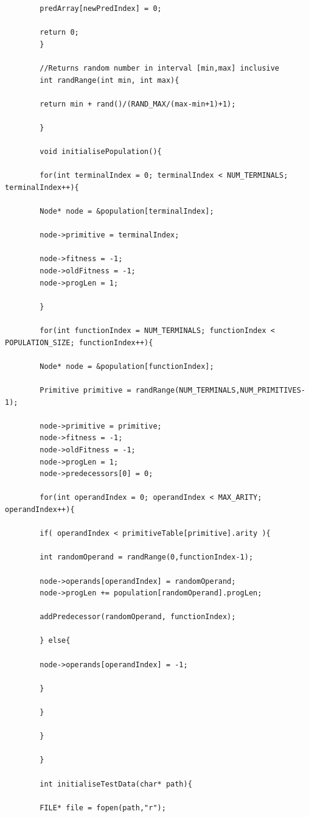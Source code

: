 \documentclass{article}
\begin{document}
\begin{lstlisting}
	    predArray[newPredIndex] = 0;
	    
	    return 0;
	    }
	    
	    //Returns random number in interval [min,max] inclusive
	    int randRange(int min, int max){
	    
	    return min + rand()/(RAND_MAX/(max-min+1)+1);
	    
	    }
	    
	    void initialisePopulation(){
	    
	    for(int terminalIndex = 0; terminalIndex < NUM_TERMINALS; terminalIndex++){
	    
	    Node* node = &population[terminalIndex];
	    
	    node->primitive = terminalIndex;
	    
	    node->fitness = -1;
	    node->oldFitness = -1;
	    node->progLen = 1;
	    
	    }
	    
	    for(int functionIndex = NUM_TERMINALS; functionIndex < POPULATION_SIZE; functionIndex++){
	    
	    Node* node = &population[functionIndex];
	    
	    Primitive primitive = randRange(NUM_TERMINALS,NUM_PRIMITIVES-1);
	    
	    node->primitive = primitive;
	    node->fitness = -1;
	    node->oldFitness = -1;
	    node->progLen = 1;
	    node->predecessors[0] = 0;
	    
	    for(int operandIndex = 0; operandIndex < MAX_ARITY; operandIndex++){
	    
	    if( operandIndex < primitiveTable[primitive].arity ){
	    
	    int randomOperand = randRange(0,functionIndex-1);
	    
	    node->operands[operandIndex] = randomOperand;
	    node->progLen += population[randomOperand].progLen;
	    
	    addPredecessor(randomOperand, functionIndex);
	    
	    } else{
	    
	    node->operands[operandIndex] = -1;
	    
	    }
	    
	    }
	    
	    }
	    
	    }
	    
	    int initialiseTestData(char* path){
	    
	    FILE* file = fopen(path,"r");
	    

\end{lstlisting}
\end{document}
